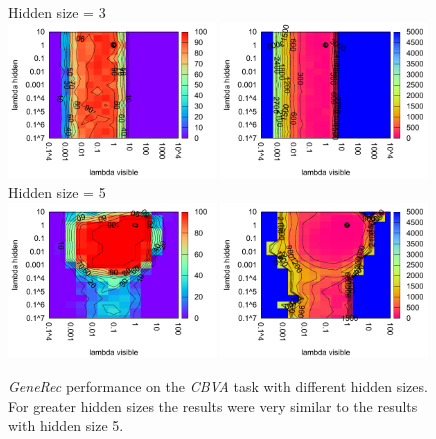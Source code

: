 \begin{figure}[H]
  \centering
  Hidden size = 3 \\
  \includegraphics[width=0.49\textwidth]{img/k3/generec-3-success.pdf} 
  \includegraphics[width=0.49\textwidth]{img/k3/generec-3-epoch.pdf}   
  Hidden size = 5 \\
  \includegraphics[width=0.49\textwidth]{img/k3/generec-5-success.pdf} 
  \includegraphics[width=0.49\textwidth]{img/k3/generec-5-epoch.pdf}  
  \caption{\emph{GeneRec} performance on the \emph{CBVA} task with different hidden sizes. For greater hidden sizes the results were very similar to the results with hidden size 5.}
  \label{fig:results-generec-k3-success}
\end{figure}

